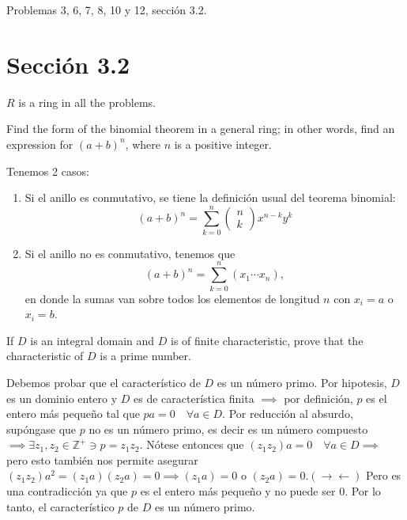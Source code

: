 




Problemas 3, 6, 7, 8, 10 y 12, sección 3.2.

\section*{Sección 3.2}

$R$ is a ring in all the problems.


\begin{problema}[Problema 3]
    Find the form of the binomial theorem in a general ring; in other words, find an expression for $(a+b)^{n}$, where $n$ is a positive integer.
    \begin{sol}
        Tenemos 2 casos:
        \begin{enumerate}
            \item Si el anillo es conmutativo, se tiene la definición usual del teorema binomial: 
                $$(a+b)^{n} = \sum_{k=0}^n\begin{pmatrix}
                    n\\
                    k
                \end{pmatrix}x^{n-k}y^k$$
            \item Si el anillo no es conmutativo, tenemos que 
            $$(a+b)^{n} = \sum_{k=0}^n(x_1\cdots x_n),$$
            en donde la sumas van sobre todos los elementos de longitud $n$ con $x_i=a$ o $x_i=b$.
        \end{enumerate}

    \end{sol}
\end{problema}

\begin{problema}[Problema 6]
    If $D$ is an integral domain and $D$ is of finite characteristic, prove that the characteristic of $D$ is a prime number.
    \begin{dem}
        Debemos probar que el característico de $D$ es un número primo. Por hipotesis, $D$ es un dominio entero y $D$ es de característica finita $\implies$ por definición, $p$ es el entero más pequeño tal que $pa=0 \quad \forall a\in D$. Por reducción al absurdo, supóngase que $p$ no es un número primo, es decir es un número compuesto $\implies \exists z_1,z_2\in \mathbb{Z}^+\ni p=z_1z_2$. Nótese entonces que $(z_1z_2)a=0 \quad \forall a\in D\implies$ pero esto también nos permite asegurar $(z_1z_2)a^2=(z_1a)(z_2a)=0\implies (z_1a)=0$ o $(z_2a)=0. (\to \gets)$ Pero es una contradicción ya que $p$ es el entero más pequeño y no puede ser 0. Por lo tanto, el característico $p$ de $D$ es un número primo. 
    \end{dem}
\end{problema}

